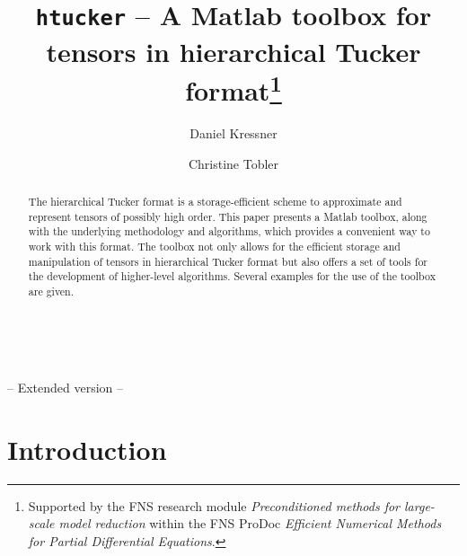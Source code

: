 \documentclass[11pt, a4paper]{article}
\begin{document}
\title{{\tt htucker} --  A {\sc Matlab} toolbox for tensors in hierarchical Tucker format\thanks{Supported by the FNS research module \emph{Preconditioned methods
for large-scale model reduction} within the FNS ProDoc \emph{Efficient Numerical Methods for Partial Differential Equations}.}%
}

\author{\renewcommand{\thefootnote}{\arabic{footnote}}Daniel Kressner\footnotemark[1] \and \renewcommand{\thefootnote}{\arabic{footnote}}Christine Tobler\footnotemark[1]}





\maketitle

\begin{preprint}                                                                                                                               
$\ $ \\[-1cm]
\begin{center}
\Large -- Extended version -- 
\end{center}
\end{preprint}

\begin{abstract}
The hierarchical Tucker format is a storage-efficient scheme to approximate and represent
tensors of possibly high order. This paper presents a {\sc Matlab} toolbox, along with
the underlying methodology and algorithms, which provides a convenient way to work with this format. The toolbox not only allows for the efficient storage and manipulation of tensors in hierarchical Tucker format
but also offers a set of tools for the development of higher-level algorithms.
Several examples for the use of the toolbox are given.
\end{abstract}

\section{Introduction}
\end{document}
